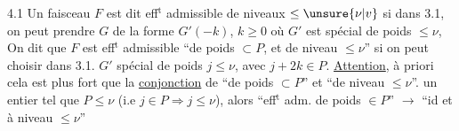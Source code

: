 4.1 Un faisceau $F$ est dit eff$^{\mathrm t}$ admissible  de niveaux $\le\unsure{\nu|v}$ si  dans 3.1, on peut prendre $G$  de la forme $G'(-k)$, $k\ge0$ où $G'$ est spécial de poids  $\le\nu$,  On dit que $F$ est eff$^{\mathrm t}$ admissible \textquotedblleft de poids $\subset P$, et de niveau $\le\nu$\textquotedblright{} si on peut choisir dans 3.1. $G'$  spécial de poids $j\le\nu$, avec  $j+2k\in P$. \uline{Attention}, à priori cela est plus fort que la \uline{conjonction} de \textquotedblleft de poids $\subset P$\textquotedblright{} et \textquotedblleft de niveau $\le\nu$\textquotedblright.   un entier tel que $P\le\nu$ (i.e $j\in P\Rightarrow j\le\nu$), alors \textquotedblleft eff$^{\mathrm t}$ adm. de poids $\in P$\textquotedblright{} $\to$ \textquotedblleft id et à niveau $\le\nu$\textquotedblright

